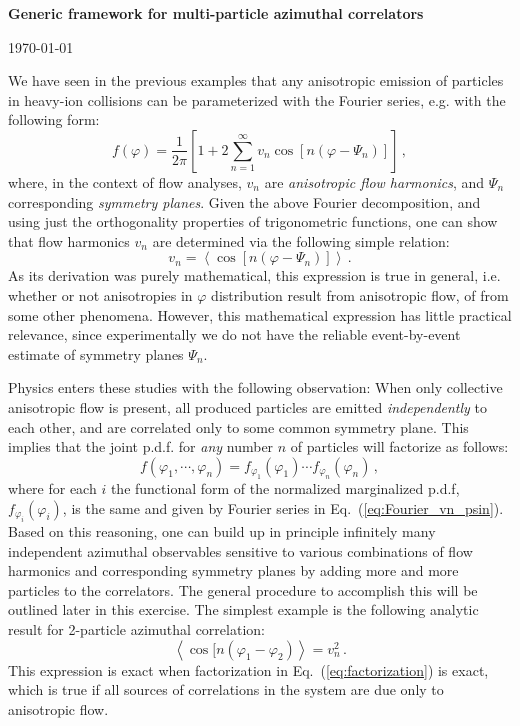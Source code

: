 \documentclass[12pt]{article}
\begin{document}
\begin{center}
\Large{\bf{Generic framework for multi-particle azimuthal correlators}}\\
\end{center}
\begin{center}
{\small\today}
\end{center}

We have seen in the previous examples that any anisotropic emission of particles in heavy-ion collisions can be parameterized with the Fourier series, e.g. with the following form:  
%
\begin{equation}
f(\varphi) = \frac{1}{2\pi}\left[1+2\sum_{n=1}^\infty v_n\cos[n(\varphi-\Psi_n)]\right]\,,
\label{eq:Fourier_vn_psin}
\end{equation}
%
where, in the context of flow analyses, $v_n$ are {\it anisotropic flow harmonics}, and $\Psi_n$ corresponding {\it symmetry planes}. Given the above Fourier decomposition, and using just the orthogonality properties of trigonometric functions, one can show that flow harmonics $v_n$ are determined via the following simple relation:
%
\begin{equation}
v_n = \left<\cos[n(\varphi-\Psi_n)]\right>\,.
\label{eq:vn}
\end{equation}
%
As its derivation was purely mathematical, this expression is true in general, i.e. whether or not anisotropies in $\varphi$ distribution result from anisotropic flow, of from some other phenomena. However, this mathematical expression has little practical relevance, since  experimentally we do not have the reliable event-by-event estimate of symmetry planes $\Psi_n$.

Physics enters these studies with the following observation: When only collective anisotropic flow is present, all produced particles are emitted {\it independently} to each other, and are correlated only to some common symmetry plane. This implies that the joint p.d.f. for {\it any} number $n$ of particles will factorize as follows:
%
\begin{equation}
f(\varphi_1,\cdots,\varphi_n) = f_{\varphi_{1}}(\varphi_{1})\cdots f_{\varphi_{n}}(\varphi_n)\,,
\label{eq:factorization}
\end{equation}
%
where for each $i$ the functional form of the normalized marginalized p.d.f, $f_{\varphi_i}(\varphi_i)$, is the same and given by Fourier series in Eq.~(\ref{eq:Fourier_vn_psin}). Based on this reasoning, one can build up in principle infinitely many independent azimuthal observables sensitive to various combinations of flow harmonics and corresponding symmetry planes by adding more and more particles to the correlators. The general procedure to accomplish this will be outlined later in this exercise. The simplest example is the following analytic result for 2-particle azimuthal correlation:  
%
\begin{equation}
\left<\cos[n(\varphi_1\!-\!\varphi_2)\right> = v_{n}^2\,.
\label{eq:2p}
\end{equation}
%
This expression is exact when factorization in Eq.~(\ref{eq:factorization}) is exact, which is true if all sources of correlations in the system are due only to anisotropic flow. 
\end{document}
